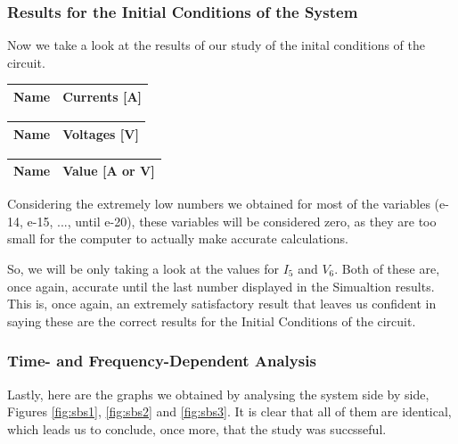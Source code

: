 \subsubsection{Results for the Initial Conditions of the System}

Now we take a look at the results of our study of the inital conditions of the circuit.

  \begin{tabular}{|l|r|}
    \hline    
    {\bf Name} & {\bf Currents [A]} \\ \hline
    
  \end{tabular}
\quad
  \begin{tabular}{|l|r|}
    \hline    
    {\bf Name} & {\bf Voltages [V]} \\ \hline
    
  \end{tabular}
\quad
\begin{tabular}{|l|r|}
    \hline    
    {\bf Name} & {\bf Value [A or V]} \\ \hline
    
  \end{tabular}

Considering the extremely low numbers we obtained for most of the variables (e-14, e-15, ..., until e-20), these variables will be considered zero, as they are too small for the computer to actually make accurate calculations.

So, we will be only taking a look at the values for $I_5$ and $V_6$. Both of these are, once again, accurate until the last number displayed in the Simualtion results. This is, once again, an extremely satisfactory result that leaves us confident in saying these are the correct results for the Initial Conditions of the circuit.

\subsubsection{Time- and Frequency-Dependent Analysis}

Lastly, here are the graphs we obtained by analysing the system side by side, Figures \ref{fig:sbs1}, \ref{fig:sbs2} and \ref{fig:sbs3}. It is clear that all of them are identical, which leads us to conclude, once more, that the study was succsseful.

